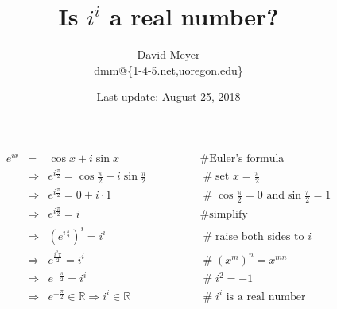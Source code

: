 \documentclass[11pt, oneside]{article}   	%
\begin{document}
\title {Is $i^i$ a real number?}
\author{David Meyer \\ dmm@\{1-4-5.net,uoregon.edu\}}

\date{Last update: August 25, 2018}							%
\maketitle



\begin{equation*}
\begin{array}{lllll}
e^{ix}
&=& \cos x + i \sin x                                                                                                   &\qquad \qquad  \mathrel{\#} \text{Euler's formula}                                                      \\ 
&\Rightarrow& e^{i \frac{\pi}{2}}  = \cos \frac{\pi}{2} + i \sin \frac{\pi}{2}                    &\qquad  \qquad  \mathrel{\#} \text{set $x = \frac{\pi}{2}$}                                            \\
&\Rightarrow& e^{i \frac{\pi}{2}}  = 0 +  i \cdot 1                                                       &\qquad  \qquad  \mathrel{\#} \cos \frac{\pi}{2} = 0 \text{ and} \sin \frac{\pi}{2} = 1       \\
&\Rightarrow& e^{i \frac{\pi}{2}}  =  i                                                                         &\qquad  \qquad  \mathrel{\#} \text{simplify}                                                                  \\
&\Rightarrow& (e^{i \frac{\pi}{2}})^i =  i^i                                                                   &\qquad  \qquad  \mathrel{\#} \text{raise both sides to $i$}                                           \\
&\Rightarrow& e^{\frac{i^2 \pi}{2}} =  i^i                                                                    &\qquad  \qquad  \mathrel{\#}  (x^m)^n = x^{mn}                                                           \\
&\Rightarrow& e^{- \frac {\pi}{2}} =  i^i                                                                      &\qquad  \qquad  \mathrel{\#} i^2 = -1                                                                            \\
&\Rightarrow& e^{- \frac {\pi}{2}} \in \mathbb{R} \Rightarrow i^i \in \mathbb{R}       &\qquad  \qquad  \mathrel{\#} \text{$i^i$ is a real number}                   
                                                        
                                                        
                                                      
\end{array}
\end{equation*}
\end{document}
